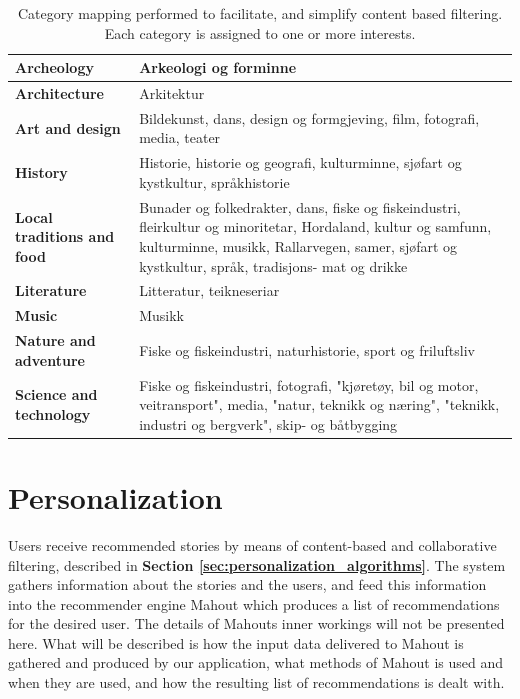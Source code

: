 \begin{table}[!h]
	\begin{center}
	\caption{Category mapping performed to facilitate, and simplify content based filtering. Each category is assigned to one or more interests.}
		\begin{tabular}{ | p{5cm} | p{12cm}|}
			\hline
			\textbf{Archeology} & Arkeologi og forminne \\ \hline
			\textbf{Architecture} & Arkitektur \\ \hline
			\textbf{Art and design} & Bildekunst, dans, design og formgjeving, film, fotografi, media, teater \\ \hline
			\textbf{History} & Historie, historie og geografi, kulturminne, sjøfart og kystkultur, språkhistorie \\ \hline
			\textbf{Local traditions and food} & Bunader og folkedrakter, dans, fiske og fiskeindustri, fleirkultur og minoritetar, Hordaland, kultur og samfunn, kulturminne, musikk, Rallarvegen, samer, sjøfart og kystkultur, språk, tradisjons- mat og drikke \\ \hline
			\textbf{Literature } & Litteratur, teikneseriar \\ \hline
			\textbf{Music} & Musikk \\ \hline
			\textbf{Nature and adventure} & Fiske og fiskeindustri, naturhistorie, sport og friluftsliv \\ \hline
			\textbf{Science and technology} & Fiske og fiskeindustri, fotografi, "kjøretøy, bil og motor, veitransport", media, "natur, teknikk og næring", "teknikk, industri og bergverk", skip- og båtbygging \\ \hline
		\end{tabular}
	\end{center}
	\label{Tab:categorymapping}
\end{table}

\section{Personalization}
\label{sec:personalization_how}

Users receive recommended stories by means of content-based and collaborative filtering, described in \textbf{Section \ref{sec:personalization_algorithms}}. The system gathers information about the stories and the users, and feed this information into the recommender engine Mahout which produces a list of recommendations for the desired user. The details of Mahouts inner workings will not be presented here. What will be described is how the input data delivered to Mahout is gathered and produced by our application, what methods of Mahout is used and when they are used, and how the resulting list of recommendations is dealt with.\newline

